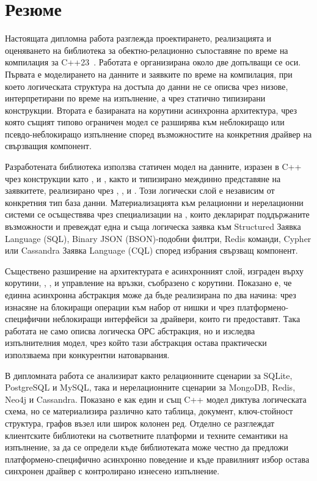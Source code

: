 \section*{Резюме}

Настоящата дипломна работа разглежда проектирането, реализацията и оценяването на библиотека за обектно-релационно съпоставяне по време на компилация за C++23~\cite{cpp23standard}. Работата е организирана около две допълващи се оси. Първата е моделирането на данните и заявките по време на компилация, при което логическата структура на достъпа до данни не се описва чрез низове, интерпретирани по време на изпълнение, а чрез статично типизирани  конструкции. Втората е базираната на корутини асинхронна архитектура, чрез която същият типово ограничен модел се разширява към неблокиращо или псевдо-неблокиращо изпълнение според възможностите на конкретния драйвер на свързващия компонент.

Разработената библиотека използва статичен модел на данните, изразен в C++ чрез конструкции като ,  и , както и типизирано междинно представяне на заявкитете, реализирано чрез , ,  и . Този логически слой е независим от конкретния тип база данни. Материализацията към релационни и нерелационни системи се осъществява чрез специализации на , които декларират поддържаните възможности и превеждат една и съща логическа заявка към Structured Заявка Language (SQL), Binary JSON (BSON)-подобни филтри, Redis команди, Cypher или Cassandra Заявка Language (CQL) според избрания свързващ компонент.

Съществено разширение на архитектурата е асинхронният слой, изграден върху корутини, , ,  и управление на връзки, съобразено с корутини. Показано е, че единна асинхронна абстракция може да бъде реализирана по два начина: чрез изнасяне на блокиращи операции към набор от нишки и чрез платформено-специфични неблокиращи интерфейси за драйвери, които ги предоставят. Така работата не само описва логическа ОРС абстракция, но и изследва изпълнителния модел, чрез който тази абстракция остава практически използваема при конкурентни натоварвания.

В дипломната работа се анализират както релационните сценарии за SQLite, PostgreSQL и MySQL, така и нерелационните сценарии за MongoDB, Redis, Neo4j и Cassandra. Показано е как един и същ C++ модел диктува логическата схема, но се материализира различно като таблица, документ, ключ-стойност структура, графов възел или широк колонен ред. Отделно се разглеждат клиентските библиотеки на съответните платформи и техните семантики на изпълнение, за да се определи къде библиотеката може честно да предложи платформено-специфично асинхронно поведение и къде правилният избор остава синхронен драйвер с контролирано изнесено изпълнение.

